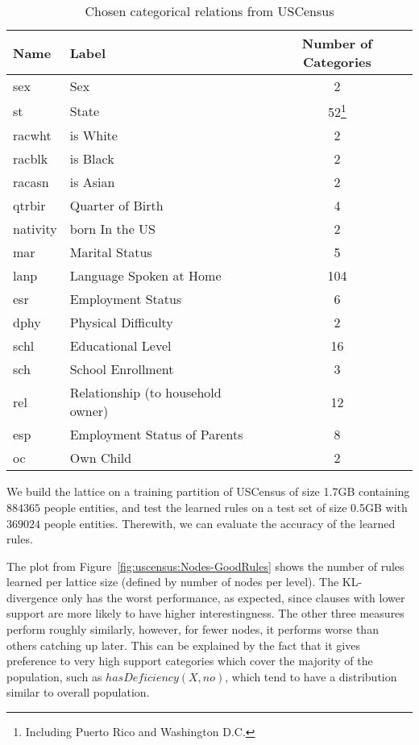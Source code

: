 \begin{table}[h!]
\begin{minipage}{\textwidth}
 \begin{center}
 \caption{Chosen categorical relations from USCensus}
  \begin{tabular}{l l c}
    \toprule
      Name	& Label				& Number of Categories \\
    \midrule
      sex	& Sex				&	2	\\
      st	& State				&	52\footnote{Including Puerto Rico and Washington D.C.}	\\
      racwht	& is White			&	2	\\
      racblk	& is Black			&	2	\\
      racasn	& is Asian			&	2	\\
      qtrbir	& Quarter of Birth		&	4	\\	
      nativity	& born In the US		&	2	\\
      mar	& Marital Status		&	5	\\
      lanp	& Language Spoken at Home	&	104	\\
      esr	& Employment Status		&	6	\\
      dphy	& Physical Difficulty		&	2	\\
      schl	& Educational Level		&	16	\\	
      sch	& School Enrollment		&	3	\\
      rel	& Relationship (to household owner)		&	12	\\
      esp	& Employment Status of Parents	&	8	\\
      oc	& Own Child			&	2	\\
    \bottomrule
  \end{tabular}
 \label{tab:uscensusRelations}
 \end{center}
\end{minipage}
\end{table}

We build the lattice on a training partition of USCensus of size 1.7GB containing $884365$ people entities, and test the
learned rules on a test set of size 0.5GB with $369024$ people entities. Therewith, we can evaluate the accuracy of the
learned rules. 

The plot from Figure~\ref{fig:uscensus:Nodes-GoodRules} shows the number of rules learned per lattice size (defined by
number of nodes per level). The KL-divergence only has the worst performance, as expected, since clauses with lower
support are more likely to have higher interestingness. The other three measures perform roughly similarly, however, for
fewer nodes, it performs worse than others catching up later. This can be explained by the fact that it gives
preference to very high support categories which cover the majority of the population, such as $hasDeficiency(X,no)$,
which tend to have a distribution similar to overall population. 

